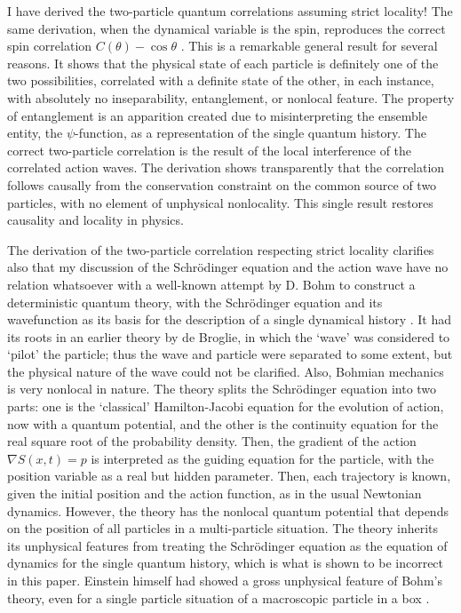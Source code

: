 I have derived the two-particle quantum correlations assuming strict locality! The same
derivation, when the dynamical variable is the spin, reproduces the correct spin correlation
$C(\theta) - \cos \theta$ \cite{chap27-key2}. This is a remarkable general result for several reasons. It shows that
the physical state of each particle is definitely one of the two possibilities, correlated with
a definite state of the other, in each instance, with absolutely no inseparability, entanglement, or nonlocal feature. The property of entanglement is an apparition created due to misinterpreting the ensemble entity, the $\psi$-function, as a representation of the single quantum history. The correct two-particle correlation is the result of the local interference of the correlated action waves. The derivation shows transparently that the correlation follows causally from the conservation constraint on the common source of two particles, with no element of unphysical nonlocality. This single result restores causality and locality in
physics.

The derivation of the two-particle correlation respecting strict locality clarifies also that
my discussion of the Schrödinger equation and the action wave have no relation whatsoever
with a well-known attempt by D. Bohm to construct a deterministic quantum theory, with
the Schrödinger equation and its wavefunction as its basis for the description of a single
dynamical history \cite{chap27-key10}. It had its roots in an earlier theory by de Broglie, in which the
‘wave' was considered to `pilot' the particle; thus the wave and particle were separated to
some extent, but the physical nature of the wave could not be clarified. Also, Bohmian
mechanics is very nonlocal in nature. The theory splits the Schr\"{o}dinger equation into two
parts: one is the `classical' Hamilton-Jacobi equation for the evolution of action, now with
a quantum potential, and the other is the continuity equation for the real square root of
the probability density. Then, the gradient of the action $\nabla S(x, t) = p$ is interpreted as the
guiding equation for the particle, with the position variable as a real but hidden parameter.
Then, each trajectory is known, given the initial position and the action function, as in the
usual Newtonian dynamics. However, the theory has the nonlocal quantum potential that
depends on the position of all particles in a multi-particle situation. The theory inherits its
unphysical features from treating the Schr\"{o}dinger equation as the equation of dynamics for
the single quantum history, which is what is shown to be incorrect in this paper. Einstein
himself had showed a gross unphysical feature of Bohm's theory, even for a single particle
situation of a macroscopic particle in a box \cite{chap27-key11}.

